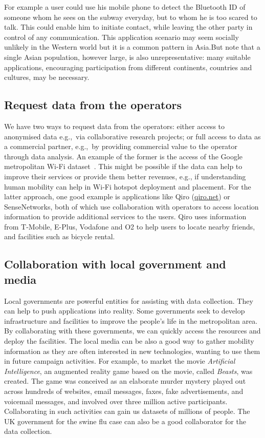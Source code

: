 \documentclass{sig-alternate-10pt}
\begin{document}
For example a user could use his mobile phone to detect the Bluetooth ID
of someone whom he sees on the subway everyday, but to whom he is too
scared to talk.
This could enable him to initiate contact, while leaving the other
party
in control of any communication. This application
scenario may seem socially unlikely in the Western world but it is a
common pattern in Asia.But note
that a single Asian population, however large, is also
unrepresentative: many suitable applications,
encouraging participation from different continents, countries
and cultures, may be necessary.


\vspace{-1mm}
\subsection{Request data from the operators}
\vspace{-1mm}
We have two ways to request data from the operators: either access to
anonymised data e.g.,~via collaborative research projects; or full
access to data as a commercial partner, e.g.,~by providing commercial
value to the operator through data analysis. An example of the former
is the access of the Google metropolitan Wi-Fi
dataset~\cite{afanasyev08googlewifi}. This might be possible if the data can
help to improve their services or provide them better revenues, e.g.,
if understanding human mobility can help in Wi-Fi hotspot deployment
and placement.
For the latter approach, one good
example is applications like Qiro (\url{qiro.net}) or
SenseNetworks, both of which use collaboration with operators to
access location information to provide additional services to the
users. Qiro uses information from T-Mobile, E-Plus, Vodafone and O2 to
help users to locate nearby friends, and facilities such as bicycle
rental.
\vspace{-1mm}
\subsection{Collaboration with local government and media}
\vspace{-1mm}
Local governments are powerful entities for assisting with data
collection. They can help to push applications into reality. Some
governments seek to develop infrastructure and facilities to improve
the people's life in the metropolitan area. By collaborating with
these governments, we can quickly access the resources and deploy the facilities. The local media can be also a
good way to gather mobility information as they are often interested
in new technologies, wanting to use them in future campaign
activities. For example, to market the movie
\textit{Artificial Intelligence}, an augmented reality
game based on the movie, called \textit{Beasts}, was created. The game
was conceived as an
elaborate murder mystery played out across hundreds of websites, email
messages, faxes, fake advertisements, and voicemail messages, and
involved over three million active
participants. Collaborating in such activities can gain us
datasets of millions of people. The UK government for the swine flu case can also be a good collaborator for the data collection.
\vspace{-1mm}
\end{document}
